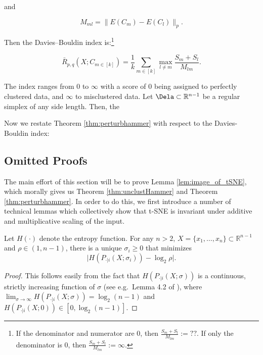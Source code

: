 and

$$M_{ml} = \lVert E(C_m) - E(C_l) \rVert_p.$$

Then the Davies–Bouldin index is:\footnote{If the denominator and numerator are 0, then $\frac{S_m+S_l}{M_{lm}} := ??$. If only the denominator is 0, then
$\frac{S_m+S_l}{M_{lm}} := \infty$.}

$$\bar{R}_{p,q}(X; C_{m\in[k]}) = \frac{1}{k} \sum_{m \in [k]} \max_{l \neq m} \frac{S_m +S_l}{M_{lm}}.$$

The index ranges from 0 to $\infty$ with a score of $0$ being assigned to perfectly clustered data, and $\infty$ to misclustered data. Let $\Dela \subset \mathbb{R}^{n-1}$ be a regular simplex of any side length. Then, the 

Now we restate Theorem \ref{thm:perturbhammer} with respect to the Davies-Bouldin index:

\fi








\subsection{Omitted Proofs}\label{sec:proofs_clust}

The main effort of this section will be to prove Lemma \ref{lem:image_of_tSNE}, which morally gives us Theorem \ref{thm:unclustHammer} and Theorem \ref{thm:perturbhammer}. In order to do this, we first introduce a number of technical lemmas which collectively show that t-SNE is invariant under additive and multiplicative scaling of the input.

\begin{lemma}\label{lem:unique_neighborhood} Let \(H(\cdot)\) denote the entropy function. For any $n>2$, \(X = \{x_1,\ldots,x_n\}\subset \mathbb{R}^{n-1}\) and \(\rho \in (1,n-1)\), there is a unique \(\sigma_i \geq 0\) that minimizes
\[\Big|  H(P_{\cdot |i}(X; \sigma_i) ) - \log_2 \rho \Big|.\]
\end{lemma}
\begin{proof}
   This follows easily from the fact that \(H(P_{\cdot |i}(X; \sigma))\) is a continuous, strictly increasing function of \(\sigma\) (see e.g.\ Lemma 4.2 of \citet{jeong2024convergence}), where \(\lim_{\sigma\to \infty}H(P_{\cdot |i}(X; \sigma)) = 
   \log_2(n-1)\) and \(H(P_{\cdot |i}(X; 0)) \in [0,\log_2(n-1)]\). %
\end{proof}


